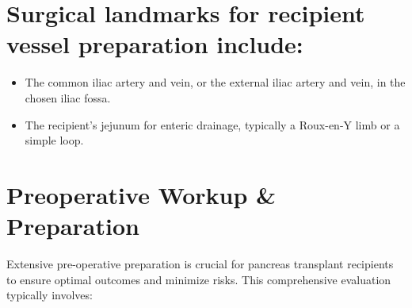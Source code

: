 \section{Surgical landmarks for recipient vessel preparation include:}
\begin{itemize}
  \item The common iliac artery and vein, or the external iliac artery and vein, in the chosen iliac fossa.
  \item The recipient's jejunum for enteric drainage, typically a Roux-en-Y limb or a simple loop.
\end{itemize}

\section*{Preoperative Workup \& Preparation}
Extensive pre-operative preparation is crucial for pancreas transplant recipients to ensure optimal outcomes and minimize risks. This comprehensive evaluation typically involves:

